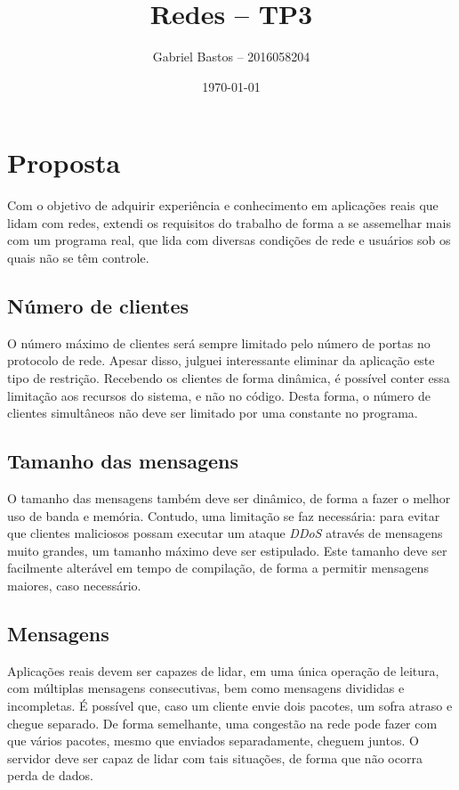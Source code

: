 \documentclass[11pt]{article}
\author{Gabriel Bastos -- 2016058204}
\date{\today}
\title{Redes -- TP3}
\begin{document}
\maketitle
\tableofcontents


\section{Proposta}
\label{sec:orgb36fa34}
Com o objetivo de adquirir experiência e conhecimento em aplicações reais que lidam com
redes, extendi os requisitos do trabalho de forma a se assemelhar mais com um programa
real, que lida com diversas condições de rede e usuários sob os quais não se têm
controle.
\subsection{Número de clientes}
\label{sec:orge192b72}
O número máximo de clientes será sempre limitado pelo número de portas no protocolo de
rede. Apesar disso, julguei interessante eliminar da aplicação este tipo de restrição.
Recebendo os clientes de forma dinâmica, é possível conter essa limitação aos recursos
do sistema, e não no código. Desta forma, o número de clientes simultâneos não deve ser
limitado por uma constante no programa.
\subsection{Tamanho das mensagens}
\label{sec:org6ea8d31}
O tamanho das mensagens também deve ser dinâmico, de forma a fazer o melhor uso de
banda e memória. Contudo, uma limitação se faz necessária: para evitar que clientes
maliciosos possam executar um ataque \emph{DDoS} através de mensagens muito grandes, um
tamanho máximo deve ser estipulado. Este tamanho deve ser facilmente alterável em tempo
de compilação, de forma a permitir mensagens maiores, caso necessário.
\subsection{Mensagens}
\label{sec:org8e60697}
Aplicações reais devem ser capazes de lidar, em uma única operação de leitura, com
múltiplas mensagens consecutivas, bem como mensagens divididas e incompletas. É
possível que, caso um cliente envie dois pacotes, um sofra atraso e chegue separado. De
forma semelhante, uma congestão na rede pode fazer com que vários pacotes, mesmo que
enviados separadamente, cheguem juntos. O servidor deve ser capaz de lidar com tais
situações, de forma que não ocorra perda de dados.
\end{document}
